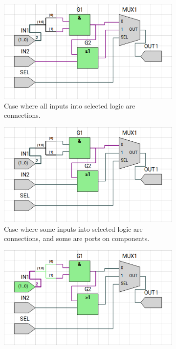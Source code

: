 \bigskip
\begin{figure} [h]
    \begin{subfigure}{0.48\textwidth}
        \centering
        \includegraphics[width=0.8\linewidth]{04.ImpPlan/SelCase1.png}
        \caption{Case where all inputs into selected logic are connections.}
        \label{subfig:SelCase1}
    \end{subfigure}
    \begin{subfigure}{0.48\textwidth}
        \centering
        \includegraphics[width=0.8\linewidth]{04.ImpPlan/SelCase2.png}
        \caption{Case where some inputs into selected logic are connections, and some are ports on components.}
        \label{subfig:SelCase2}
    \end{subfigure}
    \newline
    \begin{subfigure}{0.48\textwidth}
        \centering
        \includegraphics[width=0.8\linewidth]{04.ImpPlan/SelCase3.png}

\end{subfigure}
\end{figure}
